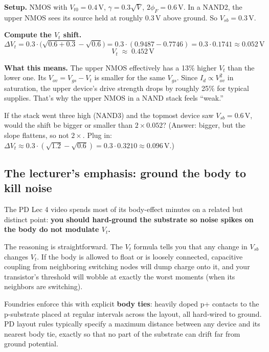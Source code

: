 \documentclass[11pt]{article}
\begin{document}
\textbf{Setup.} NMOS with $V_{t0} = 0.4\,\text{V}$, $\gamma = 0.3\sqrt{V}$, $2\phi_F = 0.6\,\text{V}$. In a NAND2, the upper NMOS sees its source held at roughly $0.3\,\text{V}$ above ground. So $V_{sb} = 0.3\,\text{V}$.

\textbf{Compute the $V_t$ shift.}
\[
\Delta V_t = 0.3 \cdot \big(\sqrt{0.6 + 0.3} - \sqrt{0.6}\big) = 0.3 \cdot (0.9487 - 0.7746) = 0.3 \cdot 0.1741 \approx 0.052\,\text{V}
\]
\[
V_t \;\approx\; 0.452\,\text{V}
\]

\textbf{What this means.} The upper NMOS effectively has a 13\% higher $V_t$ than the lower one. Its $V_{ov} = V_{gs} - V_t$ is smaller for the same $V_{gs}$. Since $I_d \propto V_{ov}^2$ in saturation, the upper device's drive strength drops by roughly 25\% for typical supplies. That's why the upper NMOS in a NAND stack feels ``weak.''

\begin{gut}
If the stack went three high (NAND3) and the topmost device saw $V_{sb} = 0.6\,\text{V}$, would the shift be bigger or smaller than $2\times 0.052$? (Answer: bigger, but the slope flattens, so not $2\times$. Plug in: $\Delta V_t \approx 0.3 \cdot (\sqrt{1.2} - \sqrt{0.6}) = 0.3 \cdot 0.3210 \approx 0.096\,\text{V}$.)
\end{gut}

\subsection{The lecturer's emphasis: ground the body to kill noise}

The PD Lec 4 video spends most of its body-effect minutes on a related but distinct point: \textbf{you should hard-ground the substrate so noise spikes on the body do not modulate $V_t$.}

The reasoning is straightforward. The $V_t$ formula tells you that any change in $V_{sb}$ changes $V_t$. If the body is allowed to float or is loosely connected, capacitive coupling from neighboring switching nodes will dump charge onto it, and your transistor's threshold will wobble at exactly the worst moments (when its neighbors are switching).

Foundries enforce this with explicit \textbf{body ties}: heavily doped p+ contacts to the p-substrate placed at regular intervals across the layout, all hard-wired to ground. PD layout rules typically specify a maximum distance between any device and its nearest body tie, exactly so that no part of the substrate can drift far from ground potential.
\end{document}
